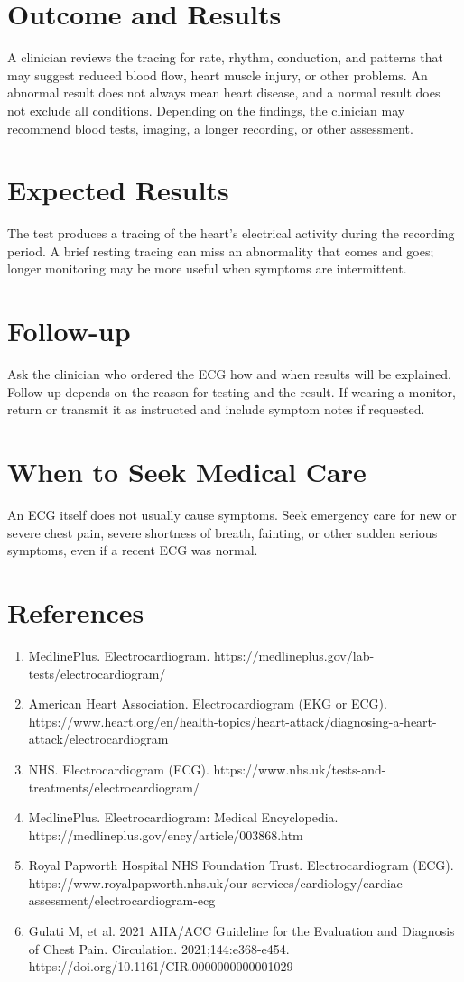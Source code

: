 \section*{Outcome and Results}
A clinician reviews the tracing for rate, rhythm, conduction, and patterns that may suggest reduced blood flow, heart muscle injury, or other problems. An abnormal result does not always mean heart disease, and a normal result does not exclude all conditions. Depending on the findings, the clinician may recommend blood tests, imaging, a longer recording, or other assessment.

\section*{Expected Results}
The test produces a tracing of the heart's electrical activity during the recording period. A brief resting tracing can miss an abnormality that comes and goes; longer monitoring may be more useful when symptoms are intermittent.

\section*{Follow-up}
Ask the clinician who ordered the ECG how and when results will be explained. Follow-up depends on the reason for testing and the result. If wearing a monitor, return or transmit it as instructed and include symptom notes if requested.

\section*{When to Seek Medical Care}
An ECG itself does not usually cause symptoms. Seek emergency care for new or severe chest pain, severe shortness of breath, fainting, or other sudden serious symptoms, even if a recent ECG was normal.

\section*{References}
\begin{enumerate}
  \item MedlinePlus. Electrocardiogram. https://medlineplus.gov/lab-tests/electrocardiogram/
  \item American Heart Association. Electrocardiogram (EKG or ECG). https://www.heart.org/en/health-topics/heart-attack/diagnosing-a-heart-attack/electrocardiogram
  \item NHS. Electrocardiogram (ECG). https://www.nhs.uk/tests-and-treatments/electrocardiogram/
  \item MedlinePlus. Electrocardiogram: Medical Encyclopedia. https://medlineplus.gov/ency/article/003868.htm
  \item Royal Papworth Hospital NHS Foundation Trust. Electrocardiogram (ECG). https://www.royalpapworth.nhs.uk/our-services/cardiology/cardiac-assessment/electrocardiogram-ecg
  \item Gulati M, et al. 2021 AHA/ACC Guideline for the Evaluation and Diagnosis of Chest Pain. Circulation. 2021;144:e368-e454. https://doi.org/10.1161/CIR.0000000000001029
\end{enumerate}

\clearpage
